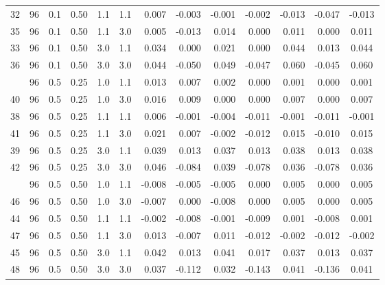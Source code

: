 \begin{longtable}[t]{ccccccrrrrrrc}
32 & 96 & 0.1 & 0.50 & 1.1 & 1.1 & 0.007 & -0.003 & -0.001 & -0.002 & -0.013 & -0.047 & -0.013\\
35 & 96 & 0.1 & 0.50 & 1.1 & 3.0 & 0.005 & -0.013 & 0.014 & 0.000 & 0.011 & 0.000 & 0.011\\
33 & 96 & 0.1 & 0.50 & 3.0 & 1.1 & 0.034 & 0.000 & 0.021 & 0.000 & 0.044 & 0.013 & 0.044\\
36 & 96 & 0.1 & 0.50 & 3.0 & 3.0 & 0.044 & -0.050 & 0.049 & -0.047 & 0.060 & -0.045 & 0.060\\
\addlinespace
37 & 96 & 0.5 & 0.25 & 1.0 & 1.1 & 0.013 & 0.007 & 0.002 & 0.000 & 0.001 & 0.000 & 0.001\\
40 & 96 & 0.5 & 0.25 & 1.0 & 3.0 & 0.016 & 0.009 & 0.000 & 0.000 & 0.007 & 0.000 & 0.007\\
38 & 96 & 0.5 & 0.25 & 1.1 & 1.1 & 0.006 & -0.001 & -0.004 & -0.011 & -0.001 & -0.011 & -0.001\\
41 & 96 & 0.5 & 0.25 & 1.1 & 3.0 & 0.021 & 0.007 & -0.002 & -0.012 & 0.015 & -0.010 & 0.015\\
39 & 96 & 0.5 & 0.25 & 3.0 & 1.1 & 0.039 & 0.013 & 0.037 & 0.013 & 0.038 & 0.013 & 0.038\\
42 & 96 & 0.5 & 0.25 & 3.0 & 3.0 & 0.046 & -0.084 & 0.039 & -0.078 & 0.036 & -0.078 & 0.036\\
\addlinespace
43 & 96 & 0.5 & 0.50 & 1.0 & 1.1 & -0.008 & -0.005 & -0.005 & 0.000 & 0.005 & 0.000 & 0.005\\
46 & 96 & 0.5 & 0.50 & 1.0 & 3.0 & -0.007 & 0.000 & -0.008 & 0.000 & 0.005 & 0.000 & 0.005\\
44 & 96 & 0.5 & 0.50 & 1.1 & 1.1 & -0.002 & -0.008 & -0.001 & -0.009 & 0.001 & -0.008 & 0.001\\
47 & 96 & 0.5 & 0.50 & 1.1 & 3.0 & 0.013 & -0.007 & 0.011 & -0.012 & -0.002 & -0.012 & -0.002\\
45 & 96 & 0.5 & 0.50 & 3.0 & 1.1 & 0.042 & 0.013 & 0.041 & 0.017 & 0.037 & 0.013 & 0.037\\
48 & 96 & 0.5 & 0.50 & 3.0 & 3.0 & 0.037 & -0.112 & 0.032 & -0.143 & 0.041 & -0.136 & 0.041\\
\bottomrule
\end{longtable}
\endgroup{}

\newpage
\begingroup\fontsize{7}{9}\selectfont
{}

